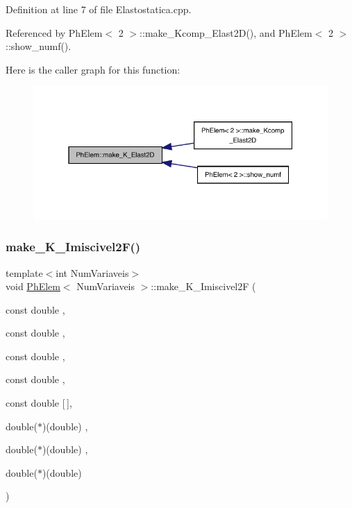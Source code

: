 Definition at line 7 of file Elastostatica.\+cpp.



Referenced by Ph\+Elem$<$ 2 $>$\+::make\+\_\+\+Kcomp\+\_\+\+Elast2\+D(), and Ph\+Elem$<$ 2 $>$\+::show\+\_\+numf().

Here is the caller graph for this function\+:
\nopagebreak
\begin{figure}[H]
\begin{center}
\leavevmode
\includegraphics[width=331pt]{classPhElem_ac59f1cbe0962524e3aa5eced9a4393f6_icgraph}
\end{center}
\end{figure}
\mbox{\label{classPhElem_ae0418a5de14872e80fe4f9ffd9dd4fdd}} 
\subsubsection{\texorpdfstring{make\+\_\+\+K\+\_\+\+Imiscivel2\+F()}{make\_K\_Imiscivel2F()}}
{\footnotesize\ttfamily template$<$int Num\+Variaveis$>$ \\
void \hyperlink{classPhElem}{Ph\+Elem}$<$ Num\+Variaveis $>$\+::make\+\_\+\+K\+\_\+\+Imiscivel2F (\begin{DoxyParamCaption}\item[{const double}]{,  }\item[{const double}]{,  }\item[{const double}]{,  }\item[{const double}]{,  }\item[{const double}]{\mbox{[}$\,$\mbox{]},  }\item[{double($\ast$)(double)}]{,  }\item[{double($\ast$)(double)}]{,  }\item[{double($\ast$)(double)}]{ }\end{DoxyParamCaption})}



